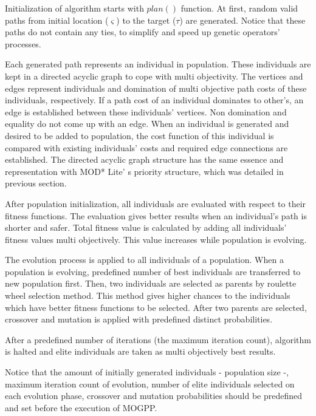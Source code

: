 Initialization of algorithm starts with $plan()$ function. At first, random valid paths from initial location ($\varsigma$) to the target ($\tau$) are generated. Notice that these paths do not contain any ties, to simplify and speed up genetic operators' processes.

Each generated path represents an individual in population. These individuals are kept in a directed acyclic graph to cope with multi objectivity. The vertices and edges represent individuals and domination of multi objective path costs of these individuals, respectively. If a path cost of an individual dominates to other's, an edge is established between these individuals' vertices. Non domination and equality do not come up with an edge. When an individual is generated and desired to be added to population, the cost function of this individual is compared with existing individuals' costs and required edge connections are established. The directed acyclic graph structure has the same essence and representation with MOD* Lite' s priority structure, which was detailed in previous section. 

After population initialization, all individuals are evaluated with respect to their fitness functions. The evaluation gives better results when an individual's path is shorter and safer. Total fitness value is calculated by adding all individuals' fitness values multi objectively. This value increases while population is evolving.

The evolution process is applied to all individuals of a population. When a population is evolving, predefined number of best individuals are transferred to new population first. Then, two individuals are selected as parents by roulette wheel selection method. This method gives higher chances to the individuals which have better fitness functions to be selected. After two parents are selected, crossover and mutation is applied with predefined distinct probabilities.

After a predefined number of iterations (the maximum iteration count), algorithm is halted and elite individuals are taken as multi objectively best results.

Notice that the amount of initially generated individuals - population size -, maximum iteration count of evolution, number of elite individuals selected on each evolution phase, crossover and mutation probabilities should be predefined and set before the execution of MOGPP.
